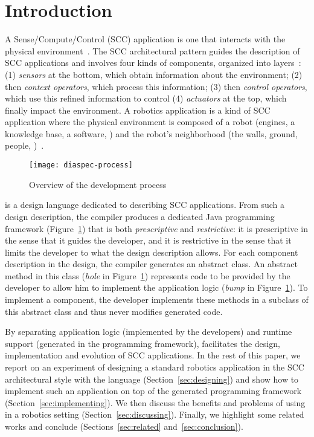 \section{Introduction}

A Sense/Compute/Control (SCC) application is one that interacts with
the physical environment~\cite{Tayl09a}. The SCC architectural pattern
guides the description of SCC applications and involves four kinds of
components, organized into layers~\cite{Cass11a,Edwar09a}: (1)
\emph{sensors} at the bottom, which obtain information about the
environment; (2) then \emph{context operators}, which process this
information; (3) then \emph{control operators}, which use this refined
information to control (4) \emph{actuators} at the top, which finally
impact the environment. A robotics application is a kind of SCC
application where the physical environment is composed of a robot
(engines, a knowledge base, a software, \etc{}) and the robot's
neighborhood (the walls, ground, people, \etc{})~\cite{Sicil08a}.

\begin{figure}
  \centering
  \texttt{[image: diaspec-process]}
  \caption{Overview of the \diaspec{} development process}
  \label{fig:diaspec-process}
\end{figure}

\diaspec{} is a design language dedicated to describing SCC
applications. From such a design description, the \diaspec{} compiler
produces a dedicated Java programming framework
(Figure~\ref{fig:diaspec-process}) that is both \emph{prescriptive}
and \emph{restrictive}: it is prescriptive in the sense that it guides
the developer, and it is restrictive in the sense that it limits the
developer to what the design description allows. For each component
description in the design, the compiler generates an abstract class.
An abstract method in this class (\emph{hole} in
Figure~\ref{fig:diaspec-process}) represents code to be provided by
the developer to allow him to implement the application logic
(\textit{bump} in Figure~\ref{fig:diaspec-process}). To implement a
component, the developer implements these methods in a subclass of
this abstract class and thus never modifies generated code.

By separating application logic (implemented by the developers) and
runtime support (generated in the programming framework), \diaspec{}
facilitates the design, implementation and evolution of SCC
applications. In the rest of this paper, we report on an experiment of
designing a standard robotics application in the SCC architectural
style with the \diaspec{} language (Section~\ref{sec:designing}) and
show how to implement such an application on top of the generated
programming framework (Section~\ref{sec:implementing}). We then
discuss the benefits and problems of using \diaspec{} in a robotics
setting (Section~\ref{sec:discussing}). Finally, we highlight some
related works and conclude (Sections~\ref{sec:related}
and~\ref{sec:conclusion}).

